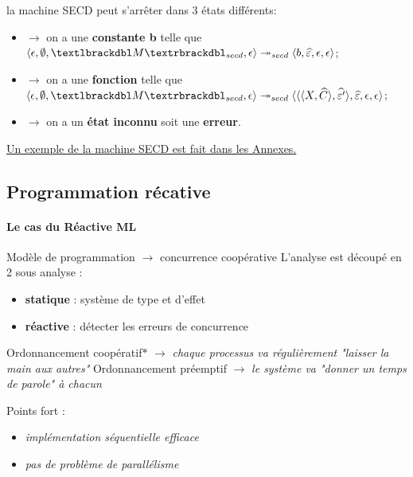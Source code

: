 \documentclass[10pt,a4paper]{article}
\begin{document}
				
				la machine SECD peut s'arrêter dans 3 états différents:
				\begin{itemize}
					\item[]$\longrightarrow$ on a une \textbf{constante b} telle que $\langle \epsilon,\emptyset,\textlbrackdbl M\textrbrackdbl_{secd},\epsilon\rangle \twoheadrightarrow_{secd} \langle b,\widehat{\varepsilon},\epsilon,\epsilon\rangle$;
					\item[]$\longrightarrow$ on a une \textbf{fonction} telle que $\langle \epsilon,\emptyset,\textlbrackdbl M\textrbrackdbl_{secd},\epsilon\rangle \twoheadrightarrow_{secd} \langle\langle\langle X,\widehat{C}\rangle,\widehat{\varepsilon'}\rangle,\widehat{\varepsilon},\epsilon,\epsilon\rangle$;
					\item[]$\longrightarrow$ on a un \textbf{état inconnu} soit une \textbf{erreur}.
				\end{itemize}
				\hyperref[SECD]{Un exemple de la machine SECD est fait dans les Annexes.}
				\bigbreak
				

		\subsection{Programmation récative}
		
			\paragraph{Le cas du Réactive ML}
				Modèle de programmation $\longrightarrow$ concurrence coopérative 
				\smallbreak
				L'analyse est découpé en 2 sous analyse :
				\begin{itemize}
					\item \textbf{statique} : système de type et d'effet
					\item \textbf{réactive} : détecter les erreurs de concurrence
				\end{itemize}
				\bigbreak
				
				
				Ordonnancement coopératif$\ast$ $\longrightarrow$ \textit{\small{chaque processus va r\'{e}guli\`{e}rement "laisser la main aux autres"}}
				\smallbreak
				Ordonnancement pr\'{e}emptif $\longrightarrow$ \textit{\small{le syst\`{e}me va "donner un temps de parole" \`{a} chacun}}
				\medbreak
					
				Points fort :
				\begin{itemize}
					\item \textit{\small{impl\'{e}mentation s\'{e}quentielle efficace}}
					\item \textit{\small{pas de probl\`{e}me de parall\'{e}lisme}}
				\end{itemize}
				\medbreak
					
\end{document}
